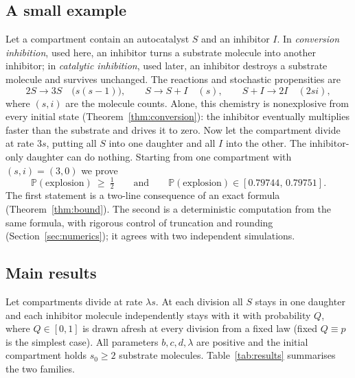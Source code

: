 \documentclass[11pt,a4paper]{article}
\numberwithin{equation}{section}
\theoremstyle{definition}\newtheorem{definition}[theorem]{Definition}
\theoremstyle{remark}\newtheorem{remark}[theorem]{Remark}\newtheorem{example}[theorem]{Example}
\renewcommand{\P}{\mathbb P}
\begin{document}
\subsection{A small example}\label{sec:example}
Let a compartment contain an autocatalyst $S$ and an inhibitor $I$. In \emph{conversion inhibition}, used here, an inhibitor turns a substrate molecule into another inhibitor; in \emph{catalytic inhibition}, used later, an inhibitor destroys a substrate molecule and survives unchanged. The reactions and stochastic propensities are
\begin{equation}\label{eq:example}
2S\to3S\quad\bigl(s(s-1)\bigr),\qquad S\to S+I\quad(s),\qquad S+I\to2I\quad(2si),
\end{equation}
where $(s,i)$ are the molecule counts. Alone, this chemistry is nonexplosive from every initial state (Theorem~\ref{thm:conversion}): the inhibitor eventually multiplies faster than the substrate and drives it to zero. Now let the compartment divide at rate $3s$, putting all $S$ into one daughter and all $I$ into the other. The inhibitor-only daughter can do nothing. Starting from one compartment with $(s,i)=(3,0)$ we prove
\[
\P(\text{explosion})\ \ge\ \tfrac12\qquad\text{and}\qquad \P(\text{explosion})\in[0.79744,\,0.79751].
\]
The first statement is a two-line consequence of an exact formula (Theorem~\ref{thm:bound}). The second is a deterministic computation from the same formula, with rigorous control of truncation and rounding (Section~\ref{sec:numerics}); it agrees with two independent simulations.

\subsection{Main results}\label{sec:results}
Let compartments divide at rate $\lambda s$. At each division all $S$ stays in one daughter and each inhibitor molecule independently stays with it with probability $Q$, where $Q\in[0,1]$ is drawn afresh at every division from a fixed law (fixed $Q\equiv p$ is the simplest case). All parameters $b,c,d,\lambda$ are positive and the initial compartment holds $s_0\ge2$ substrate molecules. Table~\ref{tab:results} summarises the two families.
\end{document}
